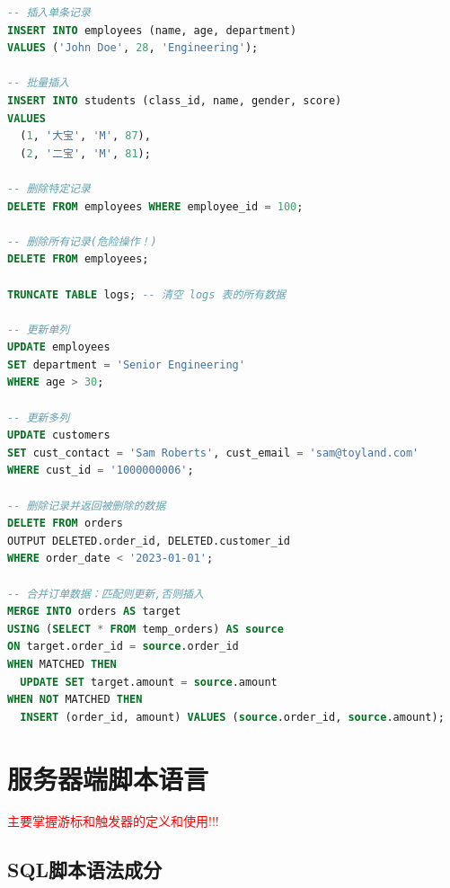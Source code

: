 \begin{lstlisting}[language=SQL]
-- 插入单条记录
INSERT INTO employees (name, age, department) 
VALUES ('John Doe', 28, 'Engineering');

-- 批量插入
INSERT INTO students (class_id, name, gender, score) 
VALUES 
  (1, '大宝', 'M', 87),
  (2, '二宝', 'M', 81);

-- 删除特定记录
DELETE FROM employees WHERE employee_id = 100;

-- 删除所有记录(危险操作！)
DELETE FROM employees;

TRUNCATE TABLE logs; -- 清空 logs 表的所有数据

-- 更新单列
UPDATE employees 
SET department = 'Senior Engineering' 
WHERE age > 30;

-- 更新多列
UPDATE customers 
SET cust_contact = 'Sam Roberts', cust_email = 'sam@toyland.com'
WHERE cust_id = '1000000006';

-- 删除记录并返回被删除的数据
DELETE FROM orders 
OUTPUT DELETED.order_id, DELETED.customer_id
WHERE order_date < '2023-01-01';

-- 合并订单数据：匹配则更新,否则插入
MERGE INTO orders AS target
USING (SELECT * FROM temp_orders) AS source
ON target.order_id = source.order_id
WHEN MATCHED THEN 
  UPDATE SET target.amount = source.amount
WHEN NOT MATCHED THEN 
  INSERT (order_id, amount) VALUES (source.order_id, source.amount);
\end{lstlisting}

\section{服务器端脚本语言}

\textcolor{red}{主要掌握游标和触发器的定义和使用!!!}

\subsection{SQL脚本语法成分}

